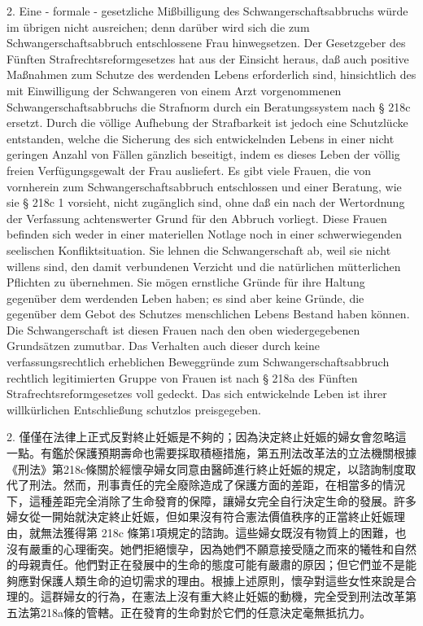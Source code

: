 \documentclass[12pt]{article}
\begin{document}
\syncleft
\begin{sourcepara}
2. Eine - formale - gesetzliche Mißbilligung des Schwangerschaftsabbruchs würde im übrigen nicht ausreichen; denn darüber wird sich die zum Schwangerschaftsabbruch entschlossene Frau hinwegsetzen. Der Gesetzgeber des Fünften Strafrechtsreformgesetzes hat aus der Einsicht heraus, daß auch positive Maßnahmen zum Schutze des werdenden Lebens erforderlich sind, hinsichtlich des mit Einwilligung der Schwangeren von einem Arzt vorgenommenen Schwangerschaftsabbruchs die Strafnorm durch ein Beratungssystem nach § 218c \abbrStGB{} ersetzt. Durch die völlige Aufhebung der Strafbarkeit ist jedoch eine Schutzlücke entstanden, welche die Sicherung des sich entwickelnden Lebens in einer nicht geringen Anzahl von Fällen gänzlich beseitigt, indem es dieses Leben der völlig freien Verfügungsgewalt der Frau ausliefert. Es gibt viele Frauen, die von vornherein zum Schwangerschaftsabbruch entschlossen und einer Beratung, wie sie § 218c \abbrAbs{} 1 vorsieht, nicht zugänglich sind, ohne daß ein nach der Wertordnung der Verfassung achtenswerter Grund für den Abbruch vorliegt. Diese Frauen befinden sich weder in einer materiellen Notlage noch in einer schwerwiegenden seelischen Konfliktsituation. Sie lehnen die Schwangerschaft ab, weil sie nicht willens sind, den damit verbundenen Verzicht und die natürlichen mütterlichen Pflichten zu übernehmen. Sie mögen ernstliche Gründe für ihre Haltung gegenüber dem werdenden Leben haben; es sind aber keine Gründe, die gegenüber dem Gebot des Schutzes menschlichen Lebens Bestand haben können. Die Schwangerschaft ist diesen Frauen nach den oben wiedergegebenen Grundsätzen zumutbar. Das Verhalten auch dieser durch keine verfassungsrechtlich erheblichen Beweggründe zum Schwangerschaftsabbruch rechtlich legitimierten Gruppe von Frauen ist nach § 218a des Fünften Strafrechtsreformgesetzes voll gedeckt. Das sich entwickelnde Leben ist ihrer willkürlichen Entschließung schutzlos preisgegeben.
\end{sourcepara}
\begin{transpara}
2. 僅僅在法律上正式反對終止妊娠是不夠的；因為決定終止妊娠的婦女會忽略這一點。有鑑於保護預期壽命也需要採取積極措施，第五刑法改革法的立法機關根據《刑法》第218c條關於經懷孕婦女同意由醫師進行終止妊娠的規定，以諮詢制度取代了刑法。然而，刑事責任的完全廢除造成了保護方面的差距，在相當多的情況下，這種差距完全消除了生命發育的保障，讓婦女完全自行決定生命的發展。許多婦女從一開始就決定終止妊娠，但如果沒有符合憲法價值秩序的正當終止妊娠理由，就無法獲得第 218c 條第1項規定的諮詢。這些婦女既沒有物質上的困難，也沒有嚴重的心理衝突。她們拒絕懷孕，因為她們不願意接受隨之而來的犧牲和自然的母親責任。他們對正在發展中的生命的態度可能有嚴肅的原因；但它們並不是能夠應對保護人類生命的迫切需求的理由。根據上述原則，懷孕對這些女性來說是合理的。這群婦女的行為，在憲法上沒有重大終止妊娠的動機，完全受到刑法改革第五法第218a條的管轄。正在發育的生命對於它們的任意決定毫無抵抗力。
\end{transpara}
\end{document}
